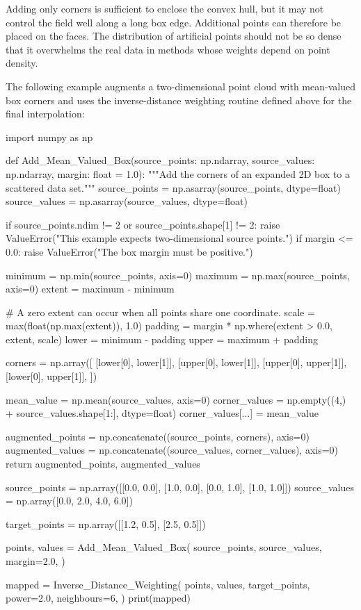 Adding only corners is sufficient to enclose the convex hull, but it may not
control the field well along a long box edge. Additional points can therefore
be placed on the faces. The distribution of artificial points should not be so
dense that it overwhelms the real data in methods whose weights depend on point
density.

The following example augments a two-dimensional point cloud with mean-valued
box corners and uses the inverse-distance weighting routine defined above for
the final interpolation:

\begin{python}
import numpy as np


def Add_Mean_Valued_Box(source_points: np.ndarray,
                        source_values: np.ndarray,
                        margin: float = 1.0):
    """Add the corners of an expanded 2D box to a scattered data set."""
    source_points = np.asarray(source_points, dtype=float)
    source_values = np.asarray(source_values, dtype=float)

    if source_points.ndim != 2 or source_points.shape[1] != 2:
        raise ValueError("This example expects two-dimensional source points.")
    if margin <= 0.0:
        raise ValueError("The box margin must be positive.")

    minimum = np.min(source_points, axis=0)
    maximum = np.max(source_points, axis=0)
    extent = maximum - minimum

    # A zero extent can occur when all points share one coordinate.
    scale = max(float(np.max(extent)), 1.0)
    padding = margin * np.where(extent > 0.0, extent, scale)
    lower = minimum - padding
    upper = maximum + padding

    corners = np.array([
        [lower[0], lower[1]],
        [upper[0], lower[1]],
        [upper[0], upper[1]],
        [lower[0], upper[1]],
    ])

    mean_value = np.mean(source_values, axis=0)
    corner_values = np.empty((4,) + source_values.shape[1:], dtype=float)
    corner_values[...] = mean_value

    augmented_points = np.concatenate((source_points, corners), axis=0)
    augmented_values = np.concatenate((source_values, corner_values), axis=0)
    return augmented_points, augmented_values


source_points = np.array([[0.0, 0.0],
                          [1.0, 0.0],
                          [0.0, 1.0],
                          [1.0, 1.0]])
source_values = np.array([0.0, 2.0, 4.0, 6.0])

target_points = np.array([[1.2, 0.5],
                          [2.5, 0.5]])

points, values = Add_Mean_Valued_Box(
    source_points,
    source_values,
    margin=2.0,
)

mapped = Inverse_Distance_Weighting(
    points,
    values,
    target_points,
    power=2.0,
    neighbours=6,
)
print(mapped)
\end{python}

